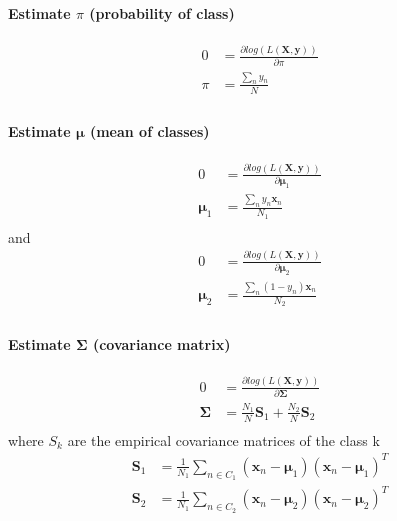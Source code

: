 \documentclass[12pt]{article}
\begin{document}
            \paragraph{Estimate $\pi$ (probability of class)}
            \begin{align*}
                0 &= \frac{\partial log(L(\boldsymbol{X}, \boldsymbol{y}))}{\partial \pi} \\
                \pi &= \frac{\sum_n{y_n}}{N} \\
            \end{align*}
            \paragraph{Estimate $\boldsymbol{\mu}$ (mean of classes)}
            \begin{align*}
                0 &= \frac{\partial log(L(\boldsymbol{X},\boldsymbol{y}))}{\partial \boldsymbol{\mu}_1} \\
                \boldsymbol{\mu}_1 &= \frac{\sum_n{y_n}{\boldsymbol{x}_n}}{N_1} \\
            \end{align*}
            and 
            \begin{align*}
                0 &= \frac{\partial log(L(\boldsymbol{X},\boldsymbol{y}))}{\partial \boldsymbol{\mu}_2} \\
                \boldsymbol{\mu}_2 &= \frac{\sum_n{(1-y_n)}{\boldsymbol{x}_n}}{N_2} \\
            \end{align*}
            \paragraph{Estimate $\boldsymbol{\Sigma}$ (covariance matrix)}
            \begin{align*}
                0 &= \frac{\partial log(L(\boldsymbol{X},\boldsymbol{y}))}{\partial \boldsymbol{\Sigma}} \\
               \boldsymbol{\Sigma} &= \frac{N_1}{N}\boldsymbol{S}_1 + \frac{N_2}{N}\boldsymbol{S}_2\\
            \end{align*}
            where $S_k$ are the empirical covariance matrices of the class k
            \begin{align*}
                \boldsymbol{S}_1 &= \frac{1}{N_1}\sum _{n\in C_1}{(\boldsymbol{x}_n-\boldsymbol{\mu}_1)(\boldsymbol{x}_n-\boldsymbol{\mu}_1)^T}\\
                \boldsymbol{S}_2 &= \frac{1}{N_1}\sum _{n\in C_2}{(\boldsymbol{x}_n-\boldsymbol{\mu}_2)(\boldsymbol{x}_n-\boldsymbol{\mu}_2)^T}\\
            \end{align*}
\end{document}
